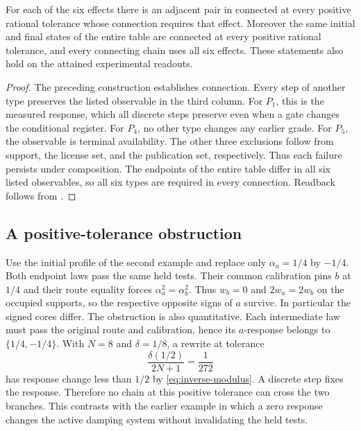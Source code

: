 \begin{theorem}\label{thm:omission}
For each of the six effects there is an adjacent pair in
 connected at every positive rational tolerance
whose connection requires that effect. Moreover the same initial
and final states of the entire table are connected at every positive
rational tolerance, and every connecting chain uses all six effects.
These statements also hold on the attained experimental readouts.
\end{theorem}
\begin{proof}
The preceding construction establishes connection. Every step of
another type preserves the listed observable in the third column.
For \(P_1\), this is the measured response, which all discrete steps
preserve even when a gate changes the conditional register.
For \(P_4\), no other type changes any earlier grade.
For \(P_5\), the observable is terminal availability.
The other three exclusions follow from support, the license set,
and the publication set, respectively. Thus each failure persists
under composition. The endpoints of the entire table differ in
all six listed observables, so all six types are required in every
connection. Readback follows from .
\end{proof}

\subsection{A positive-tolerance obstruction}\label{sec:obstruction}

Use the initial profile of the second example and replace only
\(\alpha_a=1/4\) by \(-1/4\). Both endpoint laws pass the same held
tests. Their common calibration pins \(b\) at \(1/4\) and their
route equality forces \(\alpha_a^2=\alpha_b^2\). Thus \(w_b=0\)
and \(2w_a=2w_b\) on the occupied supports, so the respective
opposite signs of \(a\) survive. In particular the signed cores
differ. The obstruction is also quantitative. Each intermediate
law must pass the original route and calibration, hence its
\(a\)-response belongs to \(\{1/4,-1/4\}\). With \(N=8\) and
\(\delta=1/8\), a rewrite at tolerance
\[
 \frac{\delta(1/2)}{2N+1}=\frac1{272}
\]
has response change less than \(1/2\) by \eqref{eq:inverse-modulus}.
A discrete step fixes the response. Therefore no chain at this
positive tolerance can cross the two branches.
This contrasts with the earlier example in which a zero
response changes the active damping system without invalidating
the held tests.


